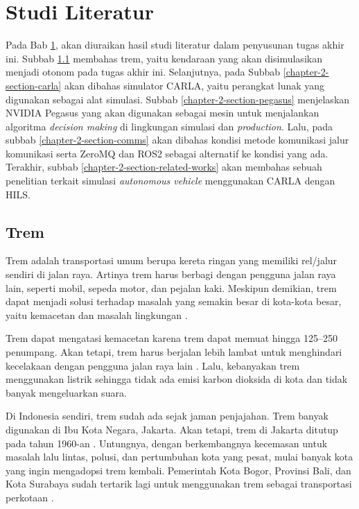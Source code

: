 \chapter{Studi Literatur}\label{chapter-2}

Pada Bab \ref{chapter-2}, akan diuraikan hasil studi literatur dalam penyusunan
tugas akhir ini. Subbab \ref{chapter-2-section-trem} membahas trem, yaitu
kendaraan yang akan disimulasikan menjadi otonom pada tugas akhir ini.
Selanjutnya, pada Subbab \ref{chapter-2-section-carla} akan dibahas simulator
CARLA, yaitu perangkat lunak yang digunakan sebagai alat simulasi.  Subbab
\ref{chapter-2-section-pegasus} menjelaskan NVIDIA Pegasus yang akan digunakan
sebagai mesin untuk menjalankan algoritma \textit{decision making} di lingkungan
simulasi dan \textit{production}. Lalu, pada subbab
\ref{chapter-2-section-comms} akan dibahas kondisi metode komunikasi jalur
komunikasi serta ZeroMQ dan ROS2 sebagai alternatif ke kondisi yang ada.
Terakhir, subbab \ref{chapter-2-section-related-works} akan membahas sebuah
penelitian terkait simulasi \textit{autonomous vehicle} menggunakan CARLA dengan
HILS.

\section{Trem}\label{chapter-2-section-trem}

Trem adalah transportasi umum berupa kereta ringan yang memiliki rel/jalur
sendiri di jalan raya. Artinya trem harus berbagi dengan pengguna jalan raya
lain, seperti mobil, sepeda motor, dan pejalan kaki. Meskipun demikian, trem
dapat menjadi solusi terhadap masalah yang semakin besar di kota-kota besar,
yaitu kemacetan dan masalah lingkungan \parencite{trilaksono_laporanRispro}.

Trem dapat mengatasi kemacetan karena trem dapat memuat hingga 125--250
penumpang.  Akan tetapi, trem harus berjalan lebih lambat untuk menghindari
kecelakaan dengan pengguna jalan raya lain \parencite{trilaksono_laporanRispro}.
Lalu, kebanyakan trem menggunakan listrik sehingga tidak ada emisi karbon
dioksida di kota dan tidak banyak mengeluarkan suara.

Di Indonesia sendiri, trem sudah ada sejak jaman penjajahan. Trem banyak
digunakan di Ibu Kota Negara, Jakarta. Akan tetapi, trem di Jakarta ditutup pada
tahun 1960-an \parencite{adryamarthanino_sejarahTremDiJakarta}. Untungnya,
dengan berkembangnya kecemasan untuk masalah lalu lintas, polusi, dan
pertumbuhan kota yang pesat, mulai banyak kota yang ingin mengadopsi trem
kembali. Pemerintah Kota Bogor, Provinsi Bali, dan Kota Surabaya sudah tertarik
lagi untuk menggunakan trem sebagai transportasi perkotaan
\parencite{trilaksono_laporanRispro}.

